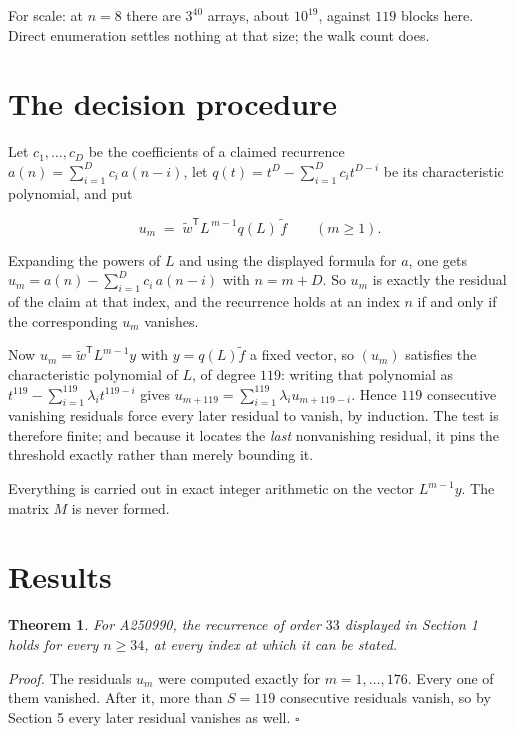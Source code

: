 \documentclass[11pt]{article}
\newtheorem{theorem}{Theorem}
\theoremstyle{definition}
\begin{document}
For scale: at $n = 8$ there are $3^{40}$ arrays, about $10^{19}$, against $119$ blocks here. Direct enumeration settles nothing at that size; the walk count does.

\section{The decision procedure}

Let $c_1,\dots,c_D$ be the coefficients of a claimed recurrence $a(n) = \sum_{i=1}^{D} c_i\,a(n-i)$, let $q(t) = t^{D} - \sum_{i=1}^{D} c_i t^{D-i}$ be its characteristic polynomial, and put

\[u_m \;=\; \tilde w^{\mathsf T} L^{\,m-1} q(L)\,\tilde f \qquad (m \ge 1).\]

Expanding the powers of $L$ and using the displayed formula for $a$, one gets $u_m = a(n) - \sum_{i=1}^{D} c_i\,a(n-i)$ with $n = m + D$. So $u_m$ is exactly the residual of the claim at that index, and the recurrence holds at an index $n$ if and only if the corresponding $u_m$ vanishes.

Now $u_m = \tilde w^{\mathsf T} L^{m-1} y$ with $y = q(L)\tilde f$ a fixed vector, so $(u_m)$ satisfies the characteristic polynomial of $L$, of degree $119$: writing that polynomial as $t^{119} - \sum_{i=1}^{119} \lambda_i t^{119-i}$ gives $u_{m+119} = \sum_{i=1}^{119} \lambda_i u_{m+119-i}$. Hence $119$ consecutive vanishing residuals force every later residual to vanish, by induction. The test is therefore finite; and because it locates the {\itshape last} nonvanishing residual, it pins the threshold exactly rather than merely bounding it.

Everything is carried out in exact integer arithmetic on the vector $L^{m-1}y$. The matrix $M$ is never formed.

\section{Results}

\begin{theorem} For A250990, the recurrence of order $33$ displayed in Section 1 holds for every $n \ge 34$, at every index at which it can be stated.\end{theorem}

{\itshape Proof.} The residuals $u_m$ were computed exactly for $m = 1,\dots,176$. Every one of them vanished. After it, more than $S = 119$ consecutive residuals vanish, so by Section 5 every later residual vanishes as well. $\square$
\end{document}
